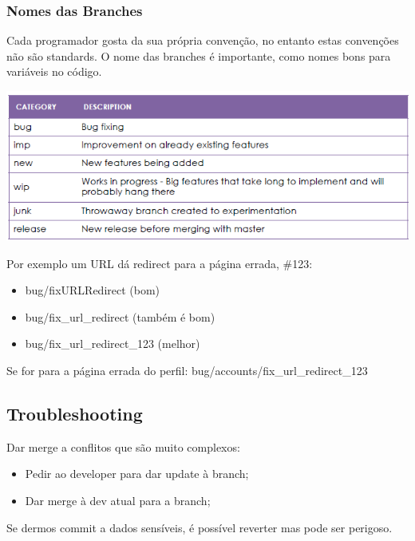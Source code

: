 \documentclass{article}
\begin{document}
\pagebreak

\subsubsection{Nomes das Branches}

Cada programador gosta da sua própria convenção, no entanto estas convenções não
são standards. O nome das branches é importante, como nomes bons para
variáveis no código.

\begin{center}
  \includegraphics[scale=0.6]{55}
\end{center}

Por exemplo um URL dá redirect para a página errada, \#123:
\begin{itemize}
  \item bug/fixURLRedirect (bom)
  \item bug/fix\_url\_redirect (também é bom)
  \item bug/fix\_url\_redirect\_123 (melhor)
\end{itemize}

Se for para a página errada do perfil: bug/accounts/fix\_url\_redirect\_123

\subsection{Troubleshooting}

Dar merge a conflitos que são muito complexos:
\begin{itemize}
  \item Pedir ao developer para dar update à branch;
  \item Dar merge à dev atual para a branch;
\end{itemize}

\vspace{2mm}

Se dermos commit a dados sensíveis, é possível reverter mas pode ser perigoso.

\vspace{2mm}
\end{document}
